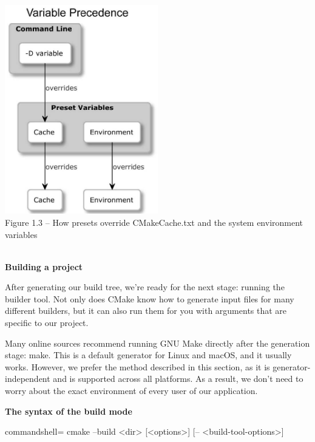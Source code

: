 \begin{center}
\includegraphics[width=0.5\textwidth]{content/1/chapter1/images/3.jpg}\\
Figure 1.3 – How presets override CMakeCache.txt and the system environment variables
\end{center}

\hspace*{\fill} \\ %
\noindent
\textbf{Building a project}

After generating our build tree, we're ready for the next stage: running the builder tool. Not only does CMake know how to generate input files for many different builders, but it can also run them for you with arguments that are specific to our project.

\begin{tcolorbox}[colback=blue!5!white,colframe=blue!75!black,title=Not Recommended]
Many online sources recommend running GNU Make directly after the generation stage: make. This is a default generator for Linux and macOS, and it usually works. However, we prefer the method described in this section, as it is generator-independent and is supported across all platforms. As a result, we don't need to worry about the exact environment of every user of our application.
\end{tcolorbox}

\textbf{The syntax of the build mode}

\begin{tcblisting}{commandshell={}}
cmake --build <dir> [<options>] [-- <build-tool-options>]
\end{tcblisting}

